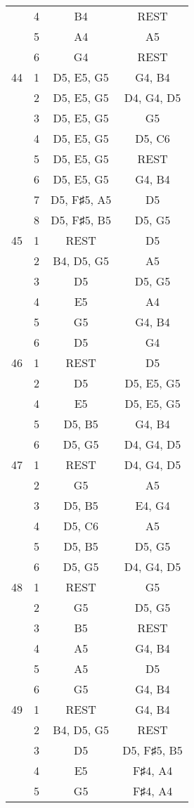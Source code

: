 \documentclass{article}
\begin{document}
\begin{longtable}{|c|c|c|c|}
  & 4 & B4 & REST \\ 
  & 5 & A4 & A5 \\ 
  & 6 & G4 & REST \\ 
\hline
44 & 1 & D5, E5, G5 & G4, B4 \\ 
  & 2 & D5, E5, G5 & D4, G4, D5 \\ 
  & 3 & D5, E5, G5 & G5 \\ 
  & 4 & D5, E5, G5 & D5, C6 \\ 
  & 5 & D5, E5, G5 & REST \\ 
  & 6 & D5, E5, G5 & G4, B4 \\ 
  & 7 & D5, F♯5, A5 & D5 \\ 
  & 8 & D5, F♯5, B5 & D5, G5 \\ 
\hline
45 & 1 & REST & D5 \\ 
  & 2 & B4, D5, G5 & A5 \\ 
  & 3 & D5 & D5, G5 \\ 
  & 4 & E5 & A4 \\ 
  & 5 & G5 & G4, B4 \\ 
  & 6 & D5 & G4 \\ 
\hline
46 & 1 & REST & D5 \\ 
  & 2 & D5 & D5, E5, G5 \\ 
  & 4 & E5 & D5, E5, G5 \\ 
  & 5 & D5, B5 & G4, B4 \\ 
  & 6 & D5, G5 & D4, G4, D5 \\ 
\hline
47 & 1 & REST & D4, G4, D5 \\ 
  & 2 & G5 & A5 \\ 
  & 3 & D5, B5 & E4, G4 \\ 
  & 4 & D5, C6 & A5 \\ 
  & 5 & D5, B5 & D5, G5 \\ 
  & 6 & D5, G5 & D4, G4, D5 \\ 
\hline
48 & 1 & REST & G5 \\ 
  & 2 & G5 & D5, G5 \\ 
  & 3 & B5 & REST \\ 
  & 4 & A5 & G4, B4 \\ 
  & 5 & A5 & D5 \\ 
  & 6 & G5 & G4, B4 \\ 
\hline
49 & 1 & REST & G4, B4 \\ 
  & 2 & B4, D5, G5 & REST \\ 
  & 3 & D5 & D5, F♯5, B5 \\ 
  & 4 & E5 & F♯4, A4 \\ 
  & 5 & G5 & F♯4, A4 \\ 

\end{longtable}
\end{document}
